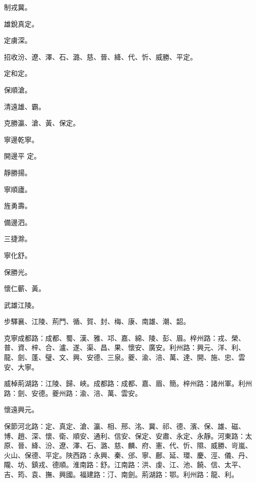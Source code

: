 \begin{pinyinscope}
 制戎冀。



 雄銳真定。



 定虜深。



 招收汾、遼、澤、石、潞、慈、晉、絳、代、忻、威勝、平定。



 定和定。



 保順滄。



 清遠雄、霸。



 克勝瀛、滄、黃、保定。



 寧邊乾寧。



 開邊平
 定。



 靜勝揚。



 寧順廬。



 旌勇壽。



 備邊泗。



 三捷滁。



 寧化舒。



 保勝光。



 懷仁蘄、黃。



 武雄江陵。



 步驛襄、江陵、荊門、循、賀、封、梅、康、南雄、潮、韶。



 克寧成都路：成都、蜀、漢、雅、邛、嘉、綿、陵、彭、眉。梓州路：戎、榮、普、資、梓、合、瀘、遂、渠、昌、果、懷安、廣安。利州路：興元、洋、利、龍、劍、蓬、璧、文、興、安德、三泉。夔、渝、涪、萬、達、開、施、忠、雲安、大寧。



 威棹荊湖路：江陵、歸、峽。成都路：成都、嘉、眉、簡。梓州路：諸州軍。利州路：劍、安德。夔州路：渝、涪、萬、雲安。



 懷遠興元。



 保節河北路：定、真定、滄、瀛、相、邢、洺、冀、祁、德、濱、保、雄、磁、博、趙、深、懷、衛、順安、通利、信安、保定、安肅、永定、永靜。河東路：太原、晉、絳、汾、遼、澤、石、潞、慈、麟、府、憲、代、忻、隰、威勝、岢嵐、火山、保德、平定。陜西路：永興、秦、邠、寧、鄜、延、環、慶、涇、儀、丹、隴、坊、鎮戎、德順。淮南路：舒。江南路：洪、虔、江、池、饒、信、太平、吉、筠、袁、撫、興國。福建路：汀、南劍。荊湖路：鄂。利州路：龍、利。




\end{pinyinscope}

